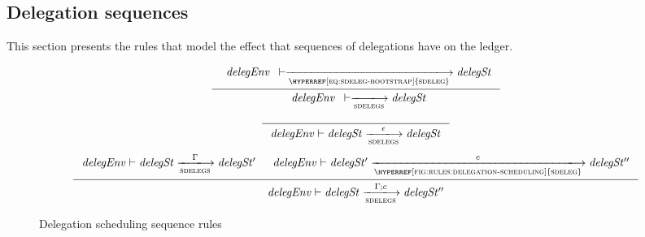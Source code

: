 \clearpage

\subsection{Delegation sequences}
\label{sec:delegation-sequences}

This section presents the rules that model the effect that sequences of
delegations have on the ledger.

\begin{figure}[htb]
  \begin{equation}
    \inference
    {
      {\begin{array}{l}
         \var{delegEnv}
      \end{array}}
      \vdash
      \trans{\hyperref[eq:sdeleg-bootstrap]{sdeleg}}{}
      \var{delegSt}
    }
    {
      {\begin{array}{l}
         \var{delegEnv}
      \end{array}}
      \vdash
      \trans{sdelegs}{}
      \var{delegSt}
    }
  \end{equation}
  \nextdef
  \begin{equation}
    \label{eq:rule:delegation-scheduling-seq-base}
    \inference
    {}
    {
      \var{delegEnv}
      \vdash
      \var{delegSt}
      \trans{sdelegs}{\epsilon}
      \var{delegSt}
    }
  \end{equation}
  \nextdef
  \begin{equation}
    \label{eq:rule:delegation-scheduling-seq-ind}
    \inference
    {
      \var{delegEnv}
      \vdash
      \var{delegSt}
      \trans{sdelegs}{\Gamma}
      \var{delegSt'}
      &
      \var{delegEnv}
      \vdash
      \var{delegSt'}
      \trans{\hyperref[fig:rules:delegation-scheduling]{sdeleg}}{c}
      \var{delegSt''}
    }
    {
      \var{delegEnv}
      \vdash
      \var{delegSt}
      \trans{sdelegs}{\Gamma; c}
      \var{delegSt''}
    }
  \end{equation}
  \caption{Delegation scheduling sequence rules}
  \label{fig:rules:delegation-scheduling-seq}
\end{figure}

